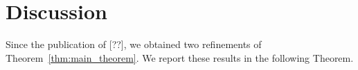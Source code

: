 \documentclass[twoside,11pt]{book}
\numberwithin{theorem}{chapter}
\numberwithin{definition}{chapter}
\numberwithin{proposition}{chapter}
\numberwithin{corollary}{chapter}
\numberwithin{example}{chapter}
\numberwithin{lemma}{chapter}
\begin{document}









\section{Discussion}
\label{s:discussion}



Since the publication of [??], we obtained two refinements of Theorem~\ref{thm:main_theorem}. We report these results in the following Theorem.
\end{document}
